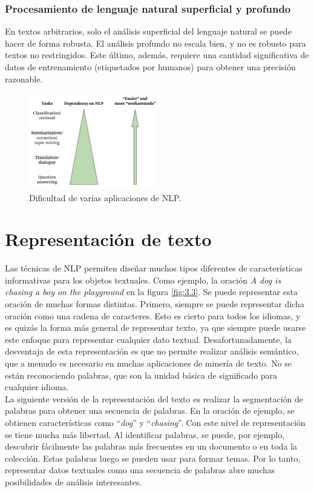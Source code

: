 \subsubsection{Procesamiento de lenguaje natural superficial y profundo}   

En textos arbitrarios, solo el análisis superficial del lenguaje natural se puede hacer de forma robusta. El análisis profundo no escala bien, y no es robusto para textos no restringidos. Este último, además, requiere una cantidad significativa de datos de entrenamiento (etiquetados por humanos) para obtener una precisión razonable.

\begin{figure}[h]
\centering
\includegraphics[width=0.5\textwidth]{fotos/4.png}
\caption{Dificultad de varias aplicaciones de NLP.}
\label{fig:4}
\end{figure}

\section{Representación de texto}

Las técnicas de NLP permiten diseñar muchos tipos diferentes de características informativas para los objetos textuales. Como ejemplo, la oración \textit{A dog is chasing a boy on the playground} en la figura \ref{fig:3.3}. Se puede representar esta oración de muchas formas distintas. Primero, siempre se puede representar dicha oración como una cadena de caracteres. Esto es cierto para todos los idiomas, y es quizás la forma más general de representar texto, ya que siempre puede usarse este enfoque para representar cualquier dato textual. Desafortunadamente, la desventaja de esta representación es que no permite realizar análisis semántico, que a menudo es necesario en muchas aplicaciones de minería de texto. No se están reconociendo palabras, que son la unidad básica de significado para cualquier idioma. \\

La siguiente versión de la representación del texto es realizar la segmentación de palabras para obtener una secuencia de palabras. En la oración de ejemplo, se obtienen características como ``\textit{dog}'' y ``\textit{chasing}''. Con este nivel de representación se tiene mucha más libertad. Al identificar palabras, se puede, por ejemplo, descubrir fácilmente las palabras más frecuentes en un documento o en toda la colección. Estas palabras luego se pueden usar para formar temas. Por lo tanto, representar datos textuales como una secuencia de palabras abre muchas posibilidades de análisis interesantes. \\

